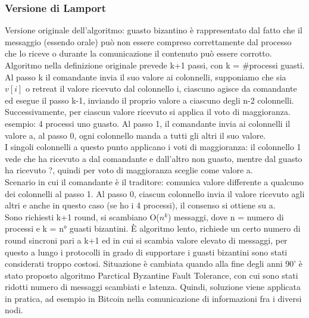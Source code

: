 \documentclass{article}
\begin{document}
\subsubsection{Versione di Lamport}
Versione originale dell'algoritmo: guasto bizantino è rappresentato dal fatto che il messaggio (essendo orale) può non essere compreso correttamente dal processo che lo riceve o durante la comunicazione il contenuto può essere corrotto.\\ Algoritmo nella definizione originale prevede k+1 passi, con k = \#processi guasti. Al passo k il comandante invia il suo valore ai colonnelli, supponiamo che sia $v[i]$ o retreat il valore ricevuto dal colonnello i, ciascuno agisce da comandante ed esegue il passo k-1, inviando il proprio valore a ciascuno degli n-2 colonnelli.\\ Successivamente, per ciascun valore ricevuto si applica il voto di maggioranza. esempio: 4 processi uno guasto. Al passo 1, il comandante invia ai colonnelli il valore a, al passo 0, ogni colonnello manda a tutti gli altri il suo valore.\\ I singoli colonnelli a questo punto applicano i voti di maggioranza: il colonnello 1 vede che ha ricevuto a dal comandante e dall'altro non guasto, mentre dal guasto ha ricevuto ?, quindi per voto di maggioranza sceglie come valore a.\\ Scenario in cui il comandante è il traditore: comunica valore differente a qualcuno dei colonnelli al passo 1. Al passo 0, ciascun colonnello invia il valore ricevuto agli altri e anche in questo caso (se ho i 4 processi), il consenso si ottiene su a.\\ Sono richiesti k+1 round, si scambiano O($n^k$) messaggi, dove n = numero di processi e k = n° guasti bizantini. È algoritmo lento, richiede un certo numero di round sincroni pari a k+1 ed in cui si scambia valore elevato di messaggi, per questo a lungo i protocolli in grado di supportare i guasti bizantini sono stati considerati troppo costosi. Situazione è cambiata quando alla fine degli anni 90' è stato proposto algoritmo Parctical Byzantine Fault Tolerance, con cui sono stati ridotti numero di messaggi scambiati e latenza. Quindi, soluzione viene applicata in pratica, ad esempio in Bitcoin nella comunicazione di informazioni fra i diversi nodi.
\end{document}
